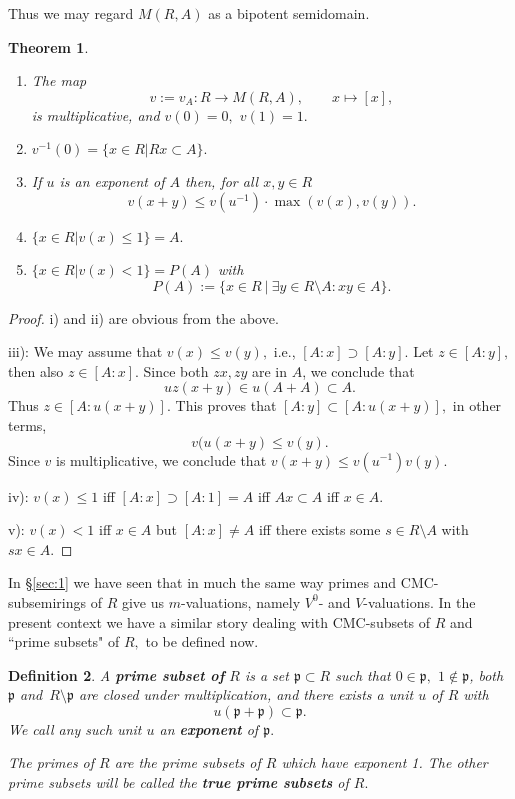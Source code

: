 \documentclass [12pt,a4paper,reqno]{amsart}
\newtheorem{thm}{Theorem} [section]
\newtheorem{defn}[thm]{Definition}
\begin{document}
Thus we may regard $M(R,A)$ as a bipotent semidomain.

\begin{thm}\label{thm4.5}
{}\quad

\begin{enumerate}
\item[i)] The map
$$v:=v_A:R\to M(R,A),\qquad x\mapsto [x],$$
is multiplicative, and $v(0)=0,$ $v(1)=1.$

\item[ii)]
$v^{-1}(0)=\{ x\in R|Rx\subset A\}.$

\item[iii)] If $u$ is an
exponent of $A$ then, for all $x,y\in R$
\begin{equation}\label{4.1}
v(x+y)\le v(u^{-1})\cdot \max(v(x),v(y)).\end{equation} \item[iv)]
$\{x\in R|v(x)\le 1\}=A.$ \item[v)] $\{x\in R|v(x)<1\}=P(A)$ with
\begin{equation}\label{4.2}
P(A):=\{x\in R {\ {|} \ }  \exists y\in R\setminus A: xy\in
A\}.\end{equation}
\end{enumerate}\end{thm}

\begin{proof}
i) and ii) are obvious from the above. {\vskip 1.5mm \noindent}

iii): We may assume that $v(x)\le v(y),$ i.e., $[A:x]\supset
[A:y].$ Let $z\in [A:y],$ then also $z\in[A:x].$ Since both
$zx,zy$ are in $A$, we conclude that
$$uz(x+y)\in u(A+A)\subset A.$$
Thus $z\in [A:u(x+y)].$ This proves that $[A:y]\subset
[A:u(x+y)],$ in other terms, $$v(u(x+y)\le v(y).$$ Since $v$ is
multiplicative, we conclude that $v(x+y)\le v(u^{-1})v(y).$ {\vskip 1.5mm \noindent}

iv): $v(x)\le 1$ iff $[A:x]\supset [A:1]=A$ iff $Ax\subset A$ iff
$x\in A.$ {\vskip 1.5mm \noindent}

v): $v(x)<1$ iff $x\in A$ but $[A:x]\ne A$ iff there exists some
$s\in R\setminus A$ with $sx\in A.$\end{proof}

In \S\ref{sec:1} we have seen that in much the same way primes and
CMC-subsemirings of $R$ give us $m$-valuations, namely ${V^0}$- and
$V$-valuations. In the present context we have a similar story
dealing with CMC-subsets of $R$ and ``prime subsets" of $R,$ to be
defined now.

\begin{defn}\label{defn4.6} A {\textbf{{prime subset of}}} $R$ is a set
${\mathfrak p}\subset R$ such that $0\in{\mathfrak p},$ $1\notin {\mathfrak p}$, both ${\mathfrak p}$
and~$R\setminus{\mathfrak p}$ are closed under multiplication, and there
exists a unit $u$ of $R$ with
$$u({\mathfrak p}+{\mathfrak p})\subset{\mathfrak p}.$$
We call any such unit $u$ an {\textbf{{exponent}}} of ${\mathfrak p}.$

The primes of $R$ are the prime subsets of $R$ which have exponent
1. The other prime subsets will be called the {\textbf{{true prime
subsets}}} of $R.$
\end{defn}
\end{document}
